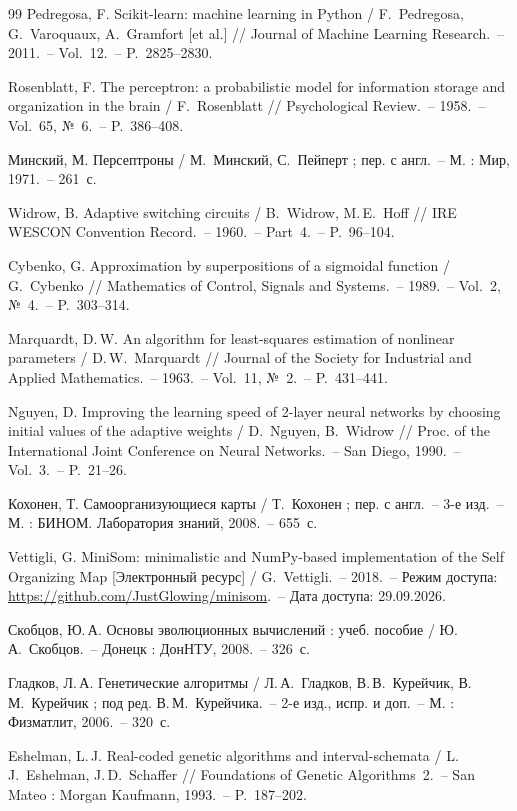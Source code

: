 \begin{thebibliography}{99}
Pedregosa, F. Scikit-learn: machine learning in Python / F.~Pedregosa, G.~Varoquaux, A.~Gramfort [et al.]
// Journal of Machine Learning Research.~-- 2011.~-- Vol.~12.~-- P.~2825--2830.

Rosenblatt, F. The perceptron: a probabilistic model for information storage and organization in the
brain / F.~Rosenblatt // Psychological Review.~-- 1958.~-- Vol.~65, №~6.~-- P.~386--408.

Минский, М. Персептроны / М.~Минский, С.~Пейперт ; пер. с англ.~-- М. : Мир, 1971.~-- 261~с.

Widrow, B. Adaptive switching circuits / B.~Widrow, M.\,E.~Hoff // IRE WESCON Convention Record.~--
1960.~-- Part~4.~-- P.~96--104.

Cybenko, G. Approximation by superpositions of a sigmoidal function / G.~Cybenko // Mathematics of
Control, Signals and Systems.~-- 1989.~-- Vol.~2, №~4.~-- P.~303--314.

Marquardt, D.\,W. An algorithm for least-squares estimation of nonlinear parameters /
D.\,W.~Marquardt // Journal of the Society for Industrial and Applied Mathematics.~-- 1963.~--
Vol.~11, №~2.~-- P.~431--441.

Nguyen, D. Improving the learning speed of 2-layer neural networks by choosing initial values of the
adaptive weights / D.~Nguyen, B.~Widrow // Proc. of the International Joint Conference on Neural
Networks.~-- San Diego, 1990.~-- Vol.~3.~-- P.~21--26.

Кохонен, Т. Самоорганизующиеся карты / Т.~Кохонен ; пер. с англ.~-- 3-е изд.~-- М. : БИНОМ.
Лаборатория знаний, 2008.~-- 655~с.

Vettigli, G. MiniSom: minimalistic and NumPy-based implementation of the Self Organizing Map
[Электронный ресурс] / G.~Vettigli.~-- 2018.~-- Режим доступа:
\url{https://github.com/JustGlowing/minisom}.~-- Дата доступа: 29.09.2026.

Скобцов, Ю.\,А. Основы эволюционных вычислений : учеб. пособие / Ю.\,А.~Скобцов.~-- Донецк : ДонНТУ,
2008.~-- 326~с.

Гладков, Л.\,А. Генетические алгоритмы / Л.\,А.~Гладков, В.\,В.~Курейчик, В.\,М.~Курейчик ; под ред.
В.\,М.~Курейчика.~-- 2-е изд., испр. и доп.~-- М. : Физматлит, 2006.~-- 320~с.

Eshelman, L.\,J. Real-coded genetic algorithms and interval-schemata / L.\,J.~Eshelman,
J.\,D.~Schaffer // Foundations of Genetic Algorithms~2.~-- San Mateo : Morgan Kaufmann, 1993.~--
P.~187--202.


\end{thebibliography}
